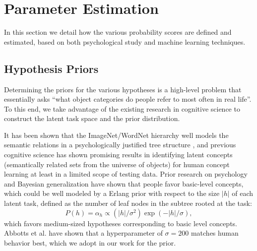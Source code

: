 \section{Parameter Estimation}
In this section we detail how the various probability scores are defined and estimated, based on both psychological study and machine learning techniques.

\subsection{Hypothesis Priors}
Determining the priors for the various hypotheses is a high-level problem that essentially asks ``what object categories do people refer to most often in real life''. To this end, we take advantage of the existing research in cognitive science to construct the latent task space and the prior distribution.

It has been shown that the ImageNet/WordNet hierarchy \cite{fellbaum2010wordnet} well models the semantic relations in a psychologically justified tree structure \cite{markman1991categorization}, and previous cognitive science has shown promising results in identifying latent concepts (semantically related sets from the universe of objects) for human concept learning \cite{abbottconstructing,tenenbaum2006theory} at least in a limited scope of testing data. Prior research on psychology and Bayesian generalization \cite{shepard1987toward,tenenbaum2001generalization} have shown that people favor basic-level concepts, which could be well modeled by a Erlang prior with respect to the size $|h|$ of each latent task, defined as the number of leaf nodes in the subtree rooted at the task:
\begin{equation}
    P(h) = \alpha_h \propto (|h|/\sigma^2) \exp(-|h|/\sigma),
\end{equation}
which favors medium-sized hypotheses corresponding to basic level concepts. Abbotts et al. have shown that a hyperparameter of $\sigma=200$ matches human behavior best, which we adopt in our work for the prior.

